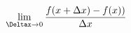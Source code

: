 \documentclass[preview]{standalone}
\begin{document}
\begin{align*}
\lim_{\Deltax\to0} \frac{f(x+\Delta x) - f(x))}{\Delta x}
\end{align*}
\end{document}
